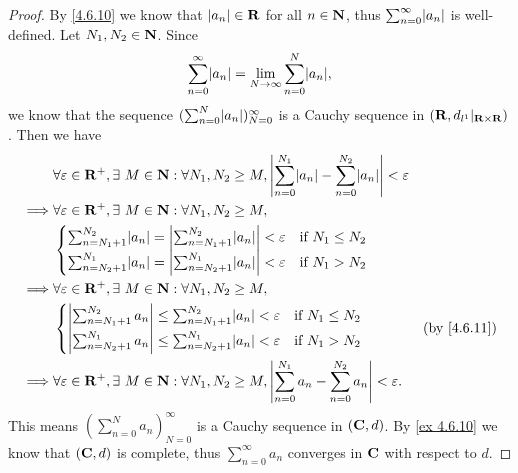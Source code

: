 \begin{proof}
  By \cref{4.6.10} we know that \(\left\lvert a_n\right\rvert \in \mathbf{R}\) for all \(n \in \mathbf{N}\), thus \(\sum_{n = 0}^\infty \abs{a_n}\) is well-defined.
  Let \(N_1, N_2 \in \mathbf{N}\).
  Since
  \[
    \sum_{n = 0}^\infty \abs{a_n} = \lim_{N \to \infty} \sum_{n = 0}^N \abs{a_n},
  \]
  we know that the sequence \((\sum_{n = 0}^N \abs{a_n})_{N = 0}^\infty\) is a Cauchy sequence in \((\mathbf{R}, d_{l^1}|_{\mathbf{R} \times \mathbf{R}})\).
  Then we have
  \begin{align*}
             & \forall \varepsilon \in \R^+, \exists\ M \in \N : \forall N_1, N_2 \geq M, \abs{\sum_{n = 0}^{N_1} \abs{a_n} - \sum_{n = 0}^{N_2} \abs{a_n}} < \varepsilon \\
    \implies & \forall \varepsilon \in \R^+, \exists\ M \in \N : \forall N_1, N_2 \geq M,                                                                                 \\
             & \begin{cases}
                 \sum_{n = N_1 + 1}^{N_2} \abs{a_n} = \abs{\sum_{n = N_1 + 1}^{N_2} \abs{a_n}} < \varepsilon & \text{if } N_1 \leq N_2 \\
                 \sum_{n = N_2 + 1}^{N_1} \abs{a_n} = \abs{\sum_{n = N_2 + 1}^{N_1} \abs{a_n}} < \varepsilon & \text{if } N_1 > N_2
               \end{cases}                       \\
    \implies & \forall \varepsilon \in \R^+, \exists\ M \in \N : \forall N_1, N_2 \geq M,                                                                                 \\
             & \begin{cases}
                 \abs{\sum_{n = N_1 + 1}^{N_2} a_n} \leq \sum_{n = N_1 + 1}^{N_2} \abs{a_n} < \varepsilon & \text{if } N_1 \leq N_2 \\
                 \abs{\sum_{n = N_2 + 1}^{N_1} a_n} \leq \sum_{n = N_2 + 1}^{N_1} \abs{a_n} < \varepsilon & \text{if } N_1 > N_2
               \end{cases}                                      & \text{(by \cref{4.6.11})}                                         \\
    \implies & \forall \varepsilon \in \R^+, \exists\ M \in \N : \forall N_1, N_2 \geq M, \abs{\sum_{n = 0}^{N_1} a_n - \sum_{n = 0}^{N_2} a_n} < \varepsilon.
  \end{align*}
  This means \((\sum_{n = 0}^N a_n)_{N = 0}^\infty\) is a Cauchy sequence in \((\mathbf{C}, d)\).
  By \cref{ex 4.6.10} we know that \((\mathbf{C}, d)\) is complete, thus \(\sum_{n = 0}^\infty a_n\) converges in \(\mathbf{C}\) with respect to \(d\).
\end{proof}

